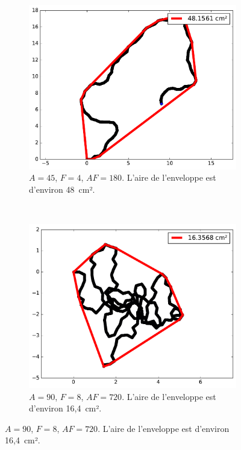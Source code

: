 \begin{figure}[htb]
\begin{subfigure}[t]{\subImgWarea}
			\label{fig:areaTraj_219_5_16}
		\end{subfigure}
		~
		\begin{subfigure}[t]{\subImgWarea}
			\centering
			\includegraphics[width=\textwidth]{figures/ch3/areaTraj_219_45_4}
			\caption[Enveloppe convexe, $A = 45$, $F=4$]{$A = 45$, $F=4$, $AF=180$. L'aire de l'enveloppe est d'environ 48~cm².}
			\label{fig:areaTraj_219_45_4}
		\end{subfigure}
		~
		\begin{subfigure}[t]{\subImgWarea}
			\centering
			\includegraphics[width=\textwidth]{figures/ch3/areaTraj_219_90_8}
			\caption[Enveloppe convexe, $A = 90$, $F=8$]{$A = 90$, $F=8$, $AF=720$. L'aire de l'enveloppe est d'environ 16,4~cm².}

\end{subfigure}
\end{figure}
